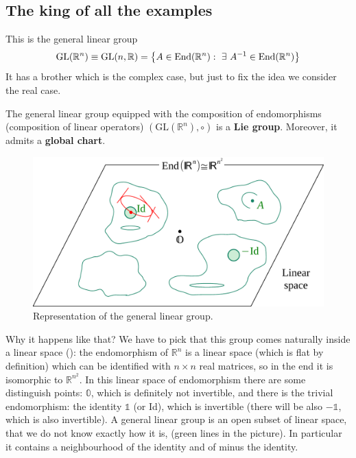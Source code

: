 \documentclass[../main.tex]{subfiles}
\begin{document}
\subsection{The king of all the examples}
This is the general linear group
\[
\textrm{GL}(\mathbb{R}^n)\equiv \textrm{GL}(n,\mathbb{R})= \Bqty{A\in \textrm{End}(\mathbb{R}^n): \ \exists \ A^{-1}\in\textrm{End}(\mathbb{R}^n)}
\]
It has a brother which is the complex case, but just to fix the idea we consider the real case.
\begin{proposition}
The general linear group equipped with the composition of endomorphisms (composition of linear operators) $(\textrm{GL}(\mathbb{R}^n), \circ )$ is a \textbf{Lie group}. Moreover, it admits a \textbf{global chart}.
\end{proposition}
\begin{figure}[h!]
	\includegraphics{images/Glob-chart-lie-group.pdf}
	\caption{Representation of the general linear group.}
\end{figure}
Why it happens like that? We have to pick that this group comes naturally inside a linear space (): the endomorphism of $\mathbb{R}^n$ is a linear space (which is flat by definition) which can be identified with $n\times n$ real matrices, so in the end it is isomorphic to $\mathbb{R}^{n^2}$. In this linear space of endomorphism there are some distinguish points: $\mathbb{0}$, which is definitely not invertible, and there is the trivial endomorphism: the identity $\mathbb{1}$ (or Id), which is invertible (there will be also $-\mathbb{1}$, which is also invertible). A general linear group is an open subset of linear space, that we do not know exactly how it is, (green lines in the picture). In particular it contains a neighbourhood of the identity and of minus the identity.
\end{document}
